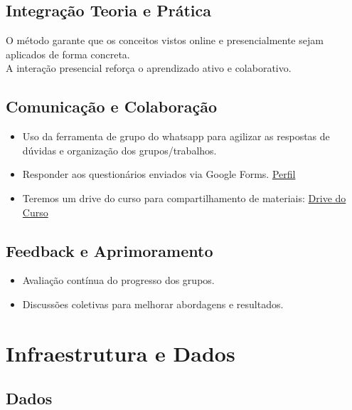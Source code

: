 \documentclass[
  letterpaper,
  DIV=11,
  numbers=noendperiod]{scrreprt}
\providecommand{\tightlist}{%
  \setlength{\itemsep}{0pt}\setlength{\parskip}{0pt}}
\begin{document}
\subsection{Integração Teoria e
Prática}\label{integrauxe7uxe3o-teoria-e-pruxe1tica}

O método garante que os conceitos vistos online e presencialmente sejam
aplicados de forma concreta.\\
A interação presencial reforça o aprendizado ativo e colaborativo.

\subsection{Comunicação e
Colaboração}\label{comunicauxe7uxe3o-e-colaborauxe7uxe3o}

\begin{itemize}
\tightlist
\item
  Uso da ferramenta de grupo do whatsapp para agilizar as respostas de
  dúvidas e organização dos grupos/trabalhos.
\item
  Responder aos questionários enviados via Google Forms.
  \href{https://docs.google.com/forms/d/e/1FAIpQLSf4KQam4J-Yf24ofwL1thVBoqjwjNVUEGHOIGI2dqVEFMpefw/viewform?usp=dialog}{Perfil}
\item
  Teremos um drive do curso para compartilhamento de materiais:
  \href{https://drive.google.com/drive/folders/1G42Ewa_4QDMsoCcIENDF0pQHAp6G_qaO}{Drive
  do Curso}
\end{itemize}

\subsection{Feedback e Aprimoramento}\label{feedback-e-aprimoramento}

\begin{itemize}
\tightlist
\item
  Avaliação contínua do progresso dos grupos.\\
\item
  Discussões coletivas para melhorar abordagens e resultados.
\end{itemize}

\section{Infraestrutura e Dados}\label{infraestrutura-e-dados}

\subsection{Dados}\label{dados}
\end{document}
